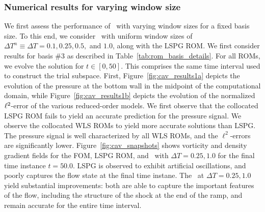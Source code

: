 \subsubsection{Numerical results for varying window size}
We first assess the performance of \methodAcronymROMs\ with varying window sizes for a fixed basis size. To this end, we consider \methodAcronymROMs\ with uniform window 
sizes of $\Delta T^n \equiv \Delta T = 0.1,0.25,0.5,$ and $1.0$, along with the LSPG ROM. We first consider results for basis \#3 as described in 
Table~\ref{tab:rom_basis_details}. For all ROMs, we evolve 
the solution for $t \in [0,50]$. This comprises the same time interval used to construct the trial subspace. First, Figure~\ref{fig:cav_results1a} depicts the evolution of the pressure at the bottom wall in the midpoint of the computational domain, while Figure~\ref{fig:cav_results1b} depicts the evolution of the normalized $\ell^2$-error of the various reduced-order models. We first observe that the collocated LSPG ROM fails to yield an accurate prediction for the pressure signal. We observe the collocated WLS ROMs to yield more accurate solutions than LSPG. The pressure signal is well characterized by all WLS ROMs, and the $\ell^2$-errors are significantly lower. 
Figure~\ref{fig:cav_snapshots} shows vorticity and density gradient fields for the FOM, LSPG ROM, and \methodAcronymROMs\ with $\Delta T = 0.25,1.0$ for the final time instance $t = 50.0$. LSPG is observed to exhibit artificial oscillations, and poorly captures the flow state at the final time instane. The \methodAcronymROMs\ at $\Delta T = 0.25,1.0$ yield substantial improvements: both are able to capture the important features of the flow, including the structure of the shock at the end of the ramp, and remain accurate for the entire time interval.  







